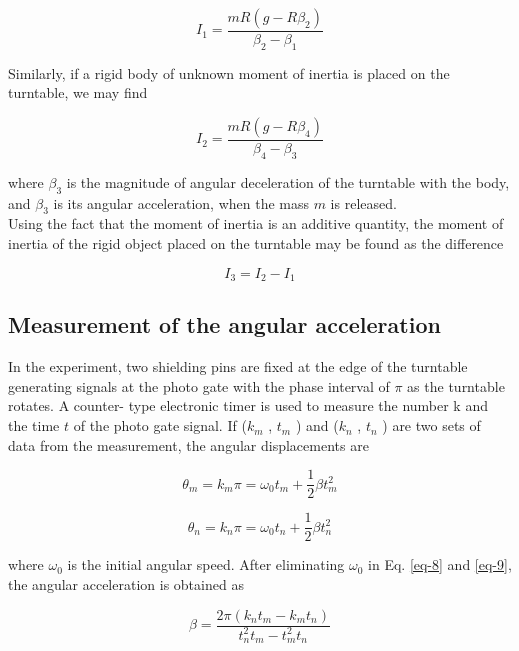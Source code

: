 \documentclass{article}
\begin{document}
\begin{equation}\label{eq-5}
I_1=\frac{mR(g-R\beta_2)}{\beta_2-\beta_1}
\end{equation}

Similarly, if a rigid body of unknown moment of inertia is placed on the turntable, we
may find

\begin{equation}\label{eq-6}
I_2=\frac{mR(g-R\beta_4)}{\beta_4-\beta_3}
\end{equation}

where $\beta_3$ is the magnitude of angular deceleration of the turntable with the body, and $\beta_3$
is its angular acceleration, when the mass $m$ is released.\\

Using the fact that the moment of inertia is an additive quantity, the moment of inertia
of the rigid object placed on the turntable may be found as the difference

\begin{equation}\label{eq-7}
I_3=I_2-I_1
\end{equation}

\subsection{Measurement of the angular acceleration}

In the experiment, two shielding pins are fixed at the edge of the turntable generating
signals at the photo gate with the phase interval of $\pi$ as the turntable rotates. A counter-
type electronic timer is used to measure the number k and the time $t$ of the photo gate
signal. If ($k_m$ , $t_m$ ) and ($k_n$ , $t_n$ ) are two sets of data from the measurement, the angular
displacements are

\begin{equation}\label{eq-8}
\theta_m=k_m\pi=\omega_0t_m+\frac{1}{2}\beta t_m^2
\end{equation}

\begin{equation}\label{eq-9}
\theta_n=k_n\pi=\omega_0t_n+\frac{1}{2}\beta t_n^2
\end{equation}

where $\omega_0$ is the initial angular speed. After eliminating $\omega_0$ in Eq. \ref{eq-8} and \ref{eq-9}, the angular
acceleration is obtained as

\begin{equation}\label{eq-10}
\beta=\frac{2\pi(k_nt_m-k_mt_n)}{t_n^2t_m-t_m^2t_n}
\end{equation}
\end{document}
